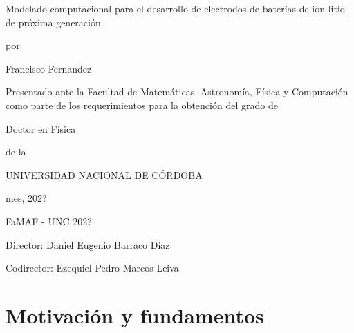 \documentclass[12pt,spanish,a4paper,twoside]{book}
\newcommand\blankpage{%
    \null
    \thispagestyle{empty}%
    \addtocounter{page}{-1}%
    \newpage
}
\begin{document}
\frontmatter


\thispagestyle{empty}
\begin{center}
{\large

    \vspace{1cm}

    {\Huge Modelado computacional para el desarrollo de electrodos de baterías de ion-litio de próxima generación}
    
    \vspace{0.5cm}
    por
    \vspace{0.5cm}
    
    {\Large Francisco Fernandez}

    \vspace{0.5cm}

    Presentado ante la Facultad de Matemáticas, Astronomía, Física y Computación 
    como parte de los requerimientos para la obtención del grado de
    
    \vspace{0.5cm}

    {\Large Doctor en Física}

    \vspace{0.5cm}
    de la

    UNIVERSIDAD NACIONAL DE CÓRDOBA

    \vspace{0.5cm}
    
    mes, 202?

    \textcopyright FaMAF - UNC 202?

    \vspace{1.5cm}

    Director: Daniel Eugenio Barraco Díaz

    Codirector: Ezequiel Pedro Marcos Leiva

}
\end{center}


\tableofcontents



\mainmatter


\part{Motivación y fundamentos}
\end{document}
